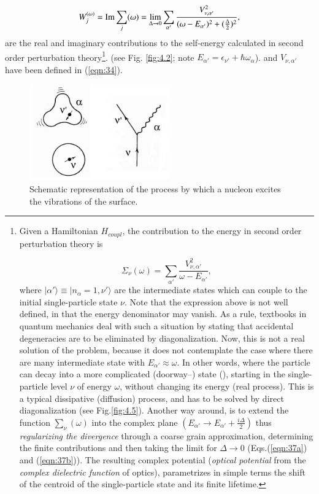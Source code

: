 \begin{equation}
W_j^{(\omega)} = {\rm Im} \sum_j(\omega) = \lim_{\Delta \rightarrow 0} \sum_{\alpha'} \frac{V_{\nu ,\alpha'}^2}{(\omega -E_{\alpha'})^2 + (\frac{\Delta}{2})^2},
\label{eqn:37b}
\end{equation}
are the real and imaginary contributions to the self-energy calculated in second order perturbation theory\footnote{Given a Hamiltonian $H_{coupl}$, the contribution to the energy in second order perturbation theory is

{\protect
\begin{equation}
\nonumber\Sigma_{\nu}(\omega) = \sum_{\alpha'} \frac{V_{\nu ,\alpha'}^2}{\omega - E_{\alpha'}} ,
\label{eqn:37c}
\end{equation}
}
where $|\alpha' \rangle \equiv |n_{\alpha}=1,\nu' \rangle$ are the intermediate states which can couple to the initial single-particle state $\nu$. Note that the expression above is not well defined, in that the energy denominator may vanish. As a rule, textbooks in quantum mechanics deal with such a situation by stating that accidental degeneracies are to be eliminated by diagonalization. Now, this is not a real solution of the problem, because it does not contemplate the case where there are many intermediate state with $E_{\alpha'} \approx \omega$. In other words, where the particle can decay into a more complicated (doorway--) state (\cite{Feshbach:58}), starting in the single-particle level $\nu$ of energy $\omega$, without changing its energy (real process). This is a typical dissipative (diffusion) process, and has to be solved by direct diagonalization (see Fig.\ref{fig:4.5}). Another way around, is to extend the function $\sum_{\nu}(\omega)$ into the complex plane $(E_{\alpha'} \rightarrow E_{\alpha'} + \frac{i\Delta}{2})$ thus {\it regularizing the divergence} through a coarse grain approximation, determining the finite contributions and then taking the limit for $\Delta \rightarrow 0$ (Eqs.(\ref{eqn:37a}) and (\ref{eqn:37b})). The resulting complex potential ({\it optical potential} from the {\it complex dielectric function} of optics), parametrizes in simple terms the shift of the centroid of the single-particle state and its finite lifetime.}. (see Fig. \ref{fig:4.2}; note $E_{\alpha'}=\epsilon_{\nu'}+\hbar\omega_\alpha$).
and $V_{\nu,\alpha'}$ have been defined in (\ref{eqn:34}).

\begin{figure}[h!]
\centerline {
\includegraphics*[width=6cm]{introduccion/figs/figintroD1}
}
\caption{Schematic representation of the process by which a nucleon excites the vibrations of the surface.}
\label{fig:4.1}
\end{figure}

